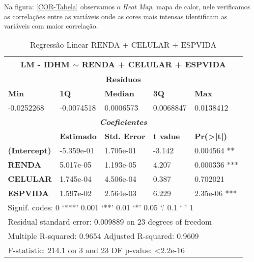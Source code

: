 \documentclass[journal]{IEEEtran}
\begin{document}
Na figura: \ref{COR-Tabela} observamos o \emph{Heat Map}, mapa de calor, nele verificamos as correlações entre as variáveis onde as cores mais intensas identificam as variáveis com maior correlação.

\begin{table}[H]
\centering
\caption{Regressão Linear RENDA + CELULAR + ESPVIDA}
\label{Regressão Linear RENDA + CELULAR + ESPVIDA}
\begin{tabular}{@{}lllll@{}}
\toprule
\multicolumn{5}{c}{\textbf{LM - IDHM $\sim$ RENDA + CELULAR + ESPVIDA}}                                          \\ \midrule
\multicolumn{5}{c}{\textbf{Resíduos}}                                                                            \\
\textbf{Min}         & \textbf{1Q}       & \textbf{Median}     & \textbf{3Q}      & \textbf{Max}                 \\
-0.0252268           & -0.0074518        & 0.0006573           & 0.0068847        & 0.0138412                    \\
\multicolumn{5}{c}{\textit{\textbf{Coeficientes}}}                                                               \\
\textit{\textbf{}}   & \textbf{Estimado} & \textbf{Std. Error} & \textbf{t value} & \textbf{Pr(\textgreater|t|)} \\
\textbf{(Intercept)} & -5.359e-01        & 1.705e-01           & -3.142           & 0.004564 **                  \\
\textbf{RENDA}       & 5.017e-05         & 1.193e-05           & 4.207            & 0.000336 ***                 \\
\textbf{CELULAR}     & 1.745e-04         & 4.506e-04           & 0.387            & 0.702021                     \\
\textbf{ESPVIDA}     & 1.597e-02         & 2.564e-03           & 6.229            & 2.35e-06 ***                 \\
\multicolumn{5}{l}{Signif. codes:     0 ‘***’ 0.001 ‘**’ 0.01 ‘*’ 0.05 ‘.’ 0.1 ‘ ’ 1}                            \\
\multicolumn{5}{l}{Residual standard error: 0.009889 on 23 degrees of freedom}                                   \\
\multicolumn{5}{l}{Multiple R-squared: 0.9654      Adjusted R-squared: 0.9609}                                   \\
\multicolumn{5}{l}{F-statistic: 214.1 on 3 and 23 DF      p-value: \textless 2.2e-16}                            \\ \bottomrule
\end{tabular}
\end{table}
\end{document}
